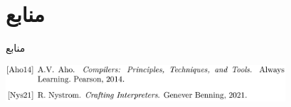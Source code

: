 \section{منابع}
\begin{frame}{منابع}
\begin{flushleft}
\includegraphics[width=0.78\textwidth, height=0.19\textheight]{docs/images/refs}
\end{flushleft}
\end{frame}